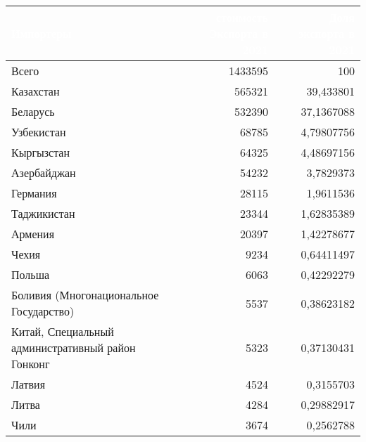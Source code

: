 \footnotesize{
\begin{tabularx}{\textwidth}{|X|r|r|}
    \hline
\rowcolor{black} \textcolor{white}{\textbf{Импортеры}} & \textcolor{white}{\textbf{стоимость Экспорта в 2021}} & \textcolor{white}{\textbf{Доля экспорта в 2021}} \\ \hline
Всего & 1433595 & 100 \\ \hline
Казахстан & 565321 & 39,433801 \\ \hline
Беларусь & 532390 & 37,1367088 \\ \hline
Узбекистан & 68785 & 4,79807756 \\ \hline
Кыргызстан & 64325 & 4,48697156 \\ \hline
Азербайджан & 54232 & 3,7829373 \\ \hline
Германия & 28115 & 1,9611536 \\ \hline
Таджикистан & 23344 & 1,62835389 \\ \hline
Армения & 20397 & 1,42278677 \\ \hline
Чехия & 9234 & 0,64411497 \\ \hline
Польша & 6063 & 0,42292279 \\ \hline
Боливия (Многонациональное Государство) & 5537 & 0,38623182 \\ \hline
Китай, Специальный административный район Гонконг & 5323 & 0,37130431 \\ \hline
Латвия & 4524 & 0,3155703 \\ \hline
Литва & 4284 & 0,29882917 \\ \hline
Чили & 3674 & 0,2562788 \\ \hline
\end{tabularx}
}